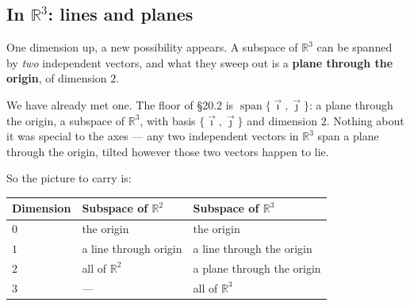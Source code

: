 \documentclass[11pt]{article}
\theoremstyle{definition}
\theoremstyle{remark}
\newcommand{\R}{\mathbb{R}}
\newcommand{\ivec}{\vec{\imath}}
\newcommand{\jvec}{\vec{\jmath}}
\DeclareMathOperator{\spanop}{span}
\begin{document}
\subsection{In \texorpdfstring{$\R^{3}$}{R3}: lines and planes}
One dimension up, a new possibility appears. A subspace of $\R^{3}$ can be
spanned by \emph{two} independent vectors, and what they sweep out is a
\textbf{plane through the origin}, of dimension $2$.

We have already met one. The floor of \S20.2 is $\spanop\{\ivec,\jvec\}$: a
plane through the origin, a subspace of $\R^{3}$, with basis $\{\ivec,\jvec\}$
and dimension $2$. Nothing about it was special to the axes --- any two
independent vectors in $\R^{3}$ span a plane through the origin, tilted however
those two vectors happen to lie.

\begin{center}
\end{center}

\noindent So the picture to carry is:
\begin{center}
\renewcommand{\arraystretch}{1.35}
\begin{tabular}{@{}l l l@{}}
\toprule
\textbf{Dimension} & \textbf{Subspace of $\R^{2}$} & \textbf{Subspace of $\R^{3}$} \\
\midrule
$0$ & the origin            & the origin \\
$1$ & a line through origin & a line through the origin \\
$2$ & all of $\R^{2}$       & a plane through the origin \\
$3$ & ---                   & all of $\R^{3}$ \\
\bottomrule
\end{tabular}
\end{center}
\end{document}
